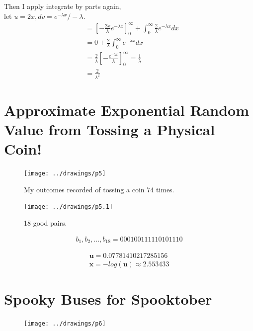 \documentclass[twocolumn]{article}
\begin{document}
Then I apply integrate by parts again, \\let $u = 2x, dv=e^{-\lambda x} /-\lambda$.
\begin{align*}
	&=[ -\frac{2x}{\lambda} e^{-\lambda x} ]_{0}^{\infty} + \int_{0}^{\infty} \frac{2}{\lambda} e^{-\lambda x}dx\\
	&=0 + \frac{2}{\lambda} \int_{0}^{\infty}  e^{-\lambda x}dx\\
	&= \frac{2}{\lambda} [ -\frac{e^{-\lambda x}}{\lambda} ]_{0}^{\infty} = \frac{1}{\lambda}\\
	&= \frac{2}{\lambda^2} 
\end{align*}


\section{Approximate Exponential Random Value from Tossing a Physical Coin!}

\begin{figure}[H]
	\centering
	\texttt{[image: ../drawings/p5]}
	\caption{My outcomes recorded of tossing a coin 74 times.}
\end{figure}
\begin{figure}[H]
	\centering
	\texttt{[image: ../drawings/p5.1]}
	\caption{18 good pairs.}
\end{figure}

\begin{align*}
	b_1, b_2, ..., b_{18} = 000100111110101110
\end{align*}


\begin{align*}
	\mathbf{u} = 0.07781410217285156\\
	\mathbf{x} = -log(\mathbf{u}) ≈ 2.553433
\end{align*}



\section{Spooky Buses for Spooktober}


\begin{figure}[H]
	\centering
	\texttt{[image: ../drawings/p6]}
	\caption{}
\end{figure}
\end{document}
